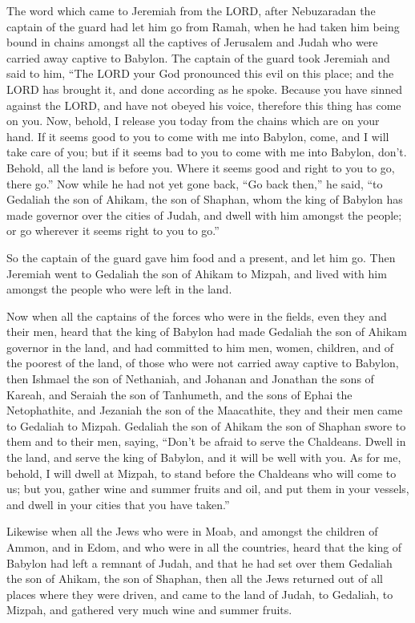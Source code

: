  The word which came to Jeremiah from the LORD, after
Nebuzaradan the captain of the guard had let him go from Ramah, when he
had taken him being bound in chains amongst all the captives of
Jerusalem and Judah who were carried away captive to Babylon.
 The captain of the guard took Jeremiah and said to him,
``The LORD your God pronounced this evil on this place; 
and the LORD has brought it, and done according as he spoke. Because you
have sinned against the LORD, and have not obeyed his voice, therefore
this thing has come on you.  Now, behold, I release you
today from the chains which are on your hand. If it seems good to you to
come with me into Babylon, come, and I will take care of you; but if it
seems bad to you to come with me into Babylon, don't. Behold, all the
land is before you. Where it seems good and right to you to go, there
go.''  Now while he had not yet gone back, ``Go back
then,'' he said, ``to Gedaliah the son of Ahikam, the son of Shaphan,
whom the king of Babylon has made governor over the cities of Judah, and
dwell with him amongst the people; or go wherever it seems right to you
to go.''

So the captain of the guard gave him food and a present, and let him go.
 Then Jeremiah went to Gedaliah the son of Ahikam to
Mizpah, and lived with him amongst the people who were left in the land.

 Now when all the captains of the forces who were in the
fields, even they and their men, heard that the king of Babylon had made
Gedaliah the son of Ahikam governor in the land, and had committed to
him men, women, children, and of the poorest of the land, of those who
were not carried away captive to Babylon,  then Ishmael
the son of Nethaniah, and Johanan and Jonathan the sons of Kareah, and
Seraiah the son of Tanhumeth, and the sons of Ephai the Netophathite,
and Jezaniah the son of the Maacathite, they and their men came to
Gedaliah to Mizpah.  Gedaliah the son of Ahikam the son of
Shaphan swore to them and to their men, saying, ``Don't be afraid to
serve the Chaldeans. Dwell in the land, and serve the king of Babylon,
and it will be well with you.  As for me, behold, I will
dwell at Mizpah, to stand before the Chaldeans who will come to us; but
you, gather wine and summer fruits and oil, and put them in your
vessels, and dwell in your cities that you have taken.''

 Likewise when all the Jews who were in Moab, and amongst
the children of Ammon, and in Edom, and who were in all the countries,
heard that the king of Babylon had left a remnant of Judah, and that he
had set over them Gedaliah the son of Ahikam, the son of Shaphan,
 then all the Jews returned out of all places where they
were driven, and came to the land of Judah, to Gedaliah, to Mizpah, and
gathered very much wine and summer fruits.

